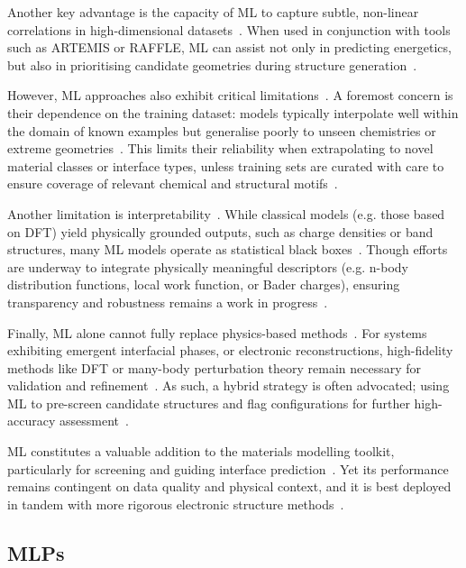 Another key advantage is the capacity of ML to capture subtle, non-linear correlations in high-dimensional datasets~\cite{Batzner2022-fd, Schutt2018-xc, Wang2024-tn}.
When used in conjunction with tools such as ARTEMIS or RAFFLE, ML can assist not only in predicting energetics, but also in prioritising candidate geometries during structure generation~\cite{Taylor2020-nl, raffle_paper}.

However, ML approaches also exhibit critical limitations~\nocite{}.
A foremost concern is their dependence on the training dataset: models typically interpolate well within the domain of known examples but generalise poorly to unseen chemistries or extreme geometries~\nocite{}.
This limits their reliability when extrapolating to novel material classes or interface types, unless training sets are curated with care to ensure coverage of relevant chemical and structural motifs~\cite{Schutt2017-ge, Schutt2019-sz, Butler2019-ws}.

Another limitation is interpretability~\nocite{}.
While classical models (e.g. those based on DFT) yield physically grounded outputs, such as charge densities or band structures, many ML models operate as statistical black boxes~\cite{Batzner2022-fd, Schutt2017-ge, Schutt2019-sz}.
Though efforts are underway to integrate physically meaningful descriptors (e.g. n-body distribution functions, local work function, or Bader charges), ensuring transparency and robustness remains a work in progress~\cite{Batzner2022-fd}.

\newpage Finally, ML alone cannot fully replace physics-based methods~\nocite{}.
For systems exhibiting emergent interfacial phases, or electronic reconstructions, high-fidelity methods like DFT or many-body perturbation theory remain necessary for validation and refinement~\nocite{}.
As such, a hybrid strategy is often advocated; using ML to pre-screen candidate structures and flag configurations for further high-accuracy assessment~\cite{Leung2020-tv, Uhrin2025-ba, Wang2024-tn}.

ML constitutes a valuable addition to the materials modelling toolkit, particularly for screening and guiding interface prediction~\nocite{}.
Yet its performance remains contingent on data quality and physical context, and it is best deployed in tandem with more rigorous electronic structure methods~\nocite{}.

\subsection*{MLPs}

